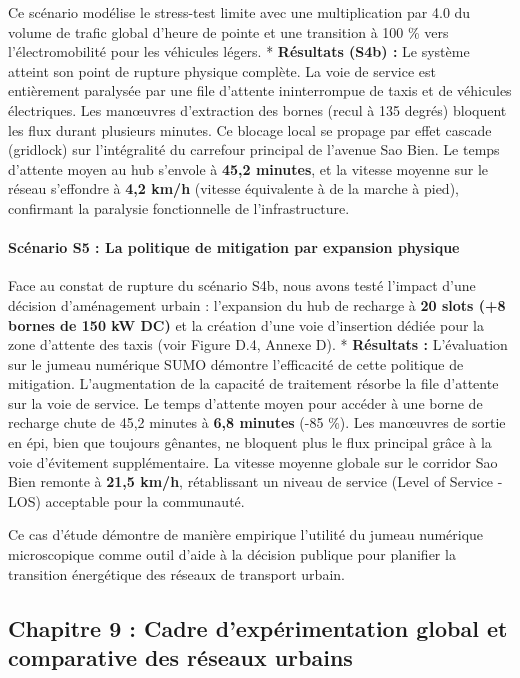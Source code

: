 \documentclass[10pt, a4paper]{article}
\begin{document}
Ce scénario modélise le stress-test limite avec une multiplication par
4.0 du volume de trafic global d'heure de pointe et une transition à 100
\% vers l'électromobilité pour les véhicules légers. * \textbf{Résultats
(S4b) :} Le système atteint son point de rupture physique complète. La
voie de service est entièrement paralysée par une file d'attente
ininterrompue de taxis et de véhicules électriques. Les manœuvres
d'extraction des bornes (recul à 135 degrés) bloquent les flux durant
plusieurs minutes. Ce blocage local se propage par effet cascade
(gridlock) sur l'intégralité du carrefour principal de l'avenue Sao
Bien. Le temps d'attente moyen au hub s'envole à \textbf{45,2 minutes},
et la vitesse moyenne sur le réseau s'effondre à \textbf{4,2 km/h}
(vitesse équivalente à de la marche à pied), confirmant la paralysie
fonctionnelle de l'infrastructure.

\paragraph{Scénario S5 : La politique de mitigation par expansion
physique}\label{scuxe9nario-s5-la-politique-de-mitigation-par-expansion-physique}

Face au constat de rupture du scénario S4b, nous avons testé l'impact
d'une décision d'aménagement urbain : l'expansion du hub de recharge à
\textbf{20 slots (+8 bornes de 150 kW DC)} et la création d'une voie
d'insertion dédiée pour la zone d'attente des taxis (voir Figure D.4,
Annexe D). * \textbf{Résultats :} L'évaluation sur le jumeau numérique
SUMO démontre l'efficacité de cette politique de mitigation.
L'augmentation de la capacité de traitement résorbe la file d'attente
sur la voie de service. Le temps d'attente moyen pour accéder à une
borne de recharge chute de 45,2 minutes à \textbf{6,8 minutes} (-85 \%).
Les manœuvres de sortie en épi, bien que toujours gênantes, ne bloquent
plus le flux principal grâce à la voie d'évitement supplémentaire. La
vitesse moyenne globale sur le corridor Sao Bien remonte à \textbf{21,5
km/h}, rétablissant un niveau de service (Level of Service - LOS)
acceptable pour la communauté.

Ce cas d'étude démontre de manière empirique l'utilité du jumeau
numérique microscopique comme outil d'aide à la décision publique pour
planifier la transition énergétique des réseaux de transport urbain.

\newpage

\subsection{Chapitre 9 : Cadre d'expérimentation global et comparative
des réseaux
urbains}\label{chapitre-9-cadre-dexpuxe9rimentation-global-et-comparative-des-ruxe9seaux-urbains}
\end{document}
